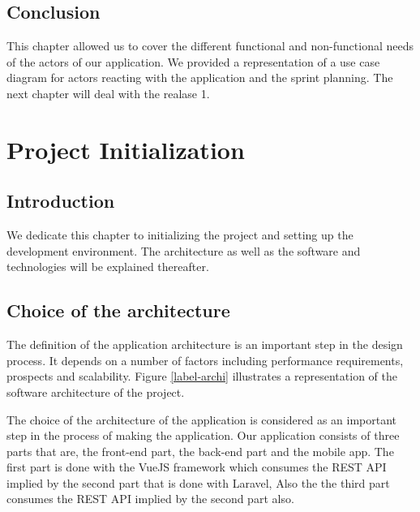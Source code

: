 \documentclass[12pt,a4paper]{report}
\begin{document}
	\section*{Conclusion}
	This chapter allowed us to cover the different functional and non-functional needs of the actors of our application. We provided a representation of a use case diagram for actors reacting with the application and the sprint planning. The next chapter will deal with the realase 1.
	\chapter{Project Initialization}
	\section*{Introduction}
	We dedicate this chapter to initializing the project and setting up the development environment. The architecture as well as the software and technologies will be explained
	thereafter.
	\section{Choice of the architecture}
	The definition of the application architecture is an important step in the design process. It depends on a number of factors including performance requirements, prospects and scalability. Figure \ref{label-archi} illustrates a representation of the software architecture of the project.\par 
	The choice of the architecture of the application is considered as an important step
	in the process of making the application. Our application
	consists of three parts that are, the front-end part, the back-end part and the mobile app. The first part
	is done with the VueJS framework which consumes the REST API implied by the second
	part that is done with Laravel, Also the the third part consumes the REST API implied by the second part also.\par
	
\end{document}
